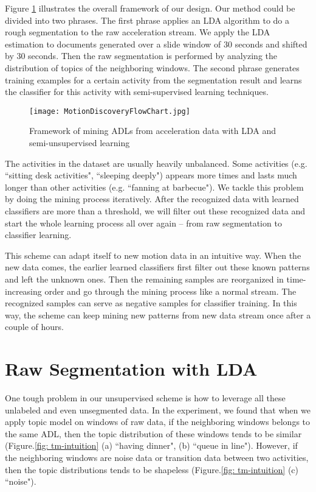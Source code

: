 \documentclass{sigchi}
\begin{document}
    Figure \ref{fig: flowchart} illustrates the overall framework of our design.
    Our method could be divided into two phrases.
    The first phrase applies an LDA algorithm to do a rough segmentation to the raw acceleration stream.
    We apply the LDA estimation to documents generated over a slide window of 30 seconds and shifted by 30 seconds.
    Then the raw segmentation is performed by analyzing the distribution of topics of the neighboring windows.
    The second phrase generates training examples for a certain activity from the segmentation result and learns the classifier for this activity with semi-supervised learning techniques.

    \begin{figure}
     \texttt{[image: MotionDiscoveryFlowChart.jpg]}
        \caption{Framework of mining ADLs from acceleration data with LDA and semi-unsupervised learning }
        \label{fig: flowchart}
    \end{figure}

    The activities in the dataset are usually heavily unbalanced.
    Some activities (e.g. ``sitting desk activities", ``sleeping deeply") appears more times and lasts much longer than other activities (e.g. ``fanning at barbecue").
    We tackle this problem by doing the mining process iteratively.
    After the recognized data with learned classifiers are more than a threshold, we will filter out these recognized data and start the whole learning process all over again -- from raw segmentation to classifier learning.

    This scheme can adapt itself to new motion data in an intuitive way.
    When the new data comes, the earlier learned classifiers first filter out these known patterns and left the unknown ones.
    Then the remaining samples are reorganized in time-increasing order and go through the mining process like a normal stream.
    The recognized samples can serve as negative samples for classifier training.
    In this way, the scheme can keep mining new patterns from new data stream once after a couple of hours.

\section{Raw Segmentation with LDA}
 \label{sec.segmentation}

 One tough problem in our unsupervised scheme is how to leverage all these unlabeled and even unsegmented data.
 In the experiment, we found that when we apply topic model on windows of raw data, if the neighboring windows belongs to the same ADL, then the topic distribution of these windows tends to be similar (Figure.\ref{fig: tm-intuition} (a) ``having dinner", (b) ``queue in line").
 However, if the neighboring windows are noise data or transition data between two activities, then the topic distributions tends to be shapeless (Figure.\ref{fig: tm-intuition} (c) ``noise").
\end{document}
